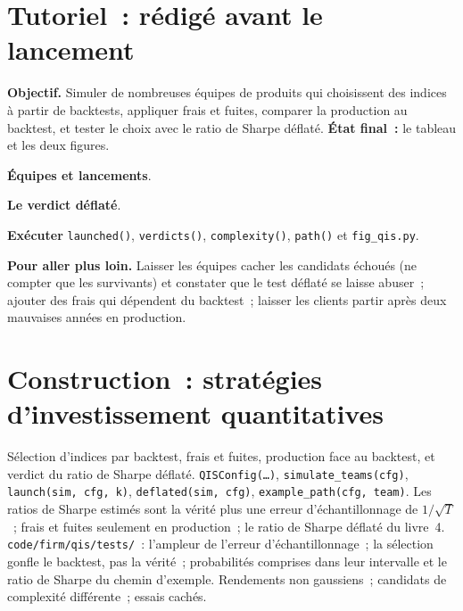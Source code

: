 \section{Tutoriel~: rédigé avant le lancement}\label{tut:s2:quantitative-investment-strategies:tut}

\begin{tutorial}
\textbf{Objectif.} Simuler de nombreuses équipes de produits qui choisissent des indices à partir de backtests, appliquer frais et fuites, comparer la production au backtest, et tester le choix
avec le ratio de Sharpe déflaté. \textbf{État final~:} le tableau et les deux figures.
\begin{tutsteps}
\item \textbf{Équipes et lancements}.
\label{lst:s2:quantitative-investment-strategies:launch}
\item \textbf{Le verdict déflaté}.
\label{lst:s2:quantitative-investment-strategies:dsr}
\item \textbf{Exécuter} \texttt{launched()}, \texttt{verdicts()}, \texttt{complexity()}, \texttt{path()} et \texttt{fig\_qis.py}.
\end{tutsteps}
\textbf{Pour aller plus loin.} Laisser les équipes cacher les candidats échoués (ne compter que les survivants) et constater que le test déflaté se laisse abuser~; ajouter des frais qui dépendent du
backtest~; laisser les clients partir après deux mauvaises années en production.
\end{tutorial}

\section{Construction~: stratégies d'investissement quantitatives}\label{bld:s2:quantitative-investment-strategies:qis}

\begin{build}
 Sélection d'indices par backtest, frais et fuites, production face au backtest, et verdict du ratio de Sharpe déflaté.
 \texttt{QISConfig(\dots)}, \texttt{simulate\_teams(cfg)}, \texttt{launch(sim, cfg, k)}, \texttt{deflated(sim, cfg)},
\texttt{example\_path(cfg, team)}.
 Les ratios de Sharpe estimés sont la vérité plus une erreur d'échantillonnage de $1/\sqrt{T}$~; frais et fuites seulement en production~; le ratio de Sharpe
déflaté du livre~4.
 \texttt{code/firm/qis/tests/}~: l'ampleur de l'erreur d'échantillonnage~; la sélection gonfle le backtest, pas la vérité~; probabilités
comprises dans leur intervalle et le ratio de Sharpe du chemin d'exemple.
 Rendements non gaussiens~; candidats de complexité différente~; essais cachés.
\end{build}

